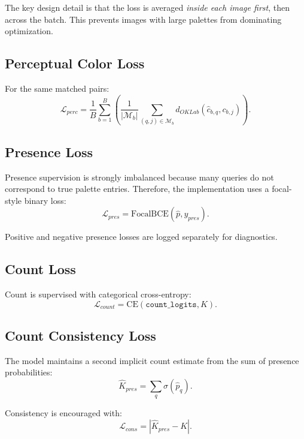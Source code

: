 \documentclass[11pt,a4paper]{article}
\begin{document}
The key design detail is that the loss is averaged \emph{inside each image first}, then across the batch. This prevents images with large palettes from dominating optimization.

\subsection{Perceptual Color Loss}

For the same matched pairs:
\begin{equation}
\mathcal{L}_{perc}
=
\frac{1}{B}
\sum_{b=1}^{B}
\left(
\frac{1}{|\mathcal{M}_b|}
\sum_{(q,j)\in\mathcal{M}_b}
d_{OKLab}(\hat{c}_{b,q}, c_{b,j})
\right).
\end{equation}

\subsection{Presence Loss}

Presence supervision is strongly imbalanced because many queries do not correspond to true palette entries. Therefore, the implementation uses a focal-style binary loss:
\begin{equation}
\mathcal{L}_{pres} = \text{FocalBCE}(\hat{p}, y_{pres}).
\end{equation}

Positive and negative presence losses are logged separately for diagnostics.

\subsection{Count Loss}

Count is supervised with categorical cross-entropy:
\begin{equation}
\mathcal{L}_{count}
=
\text{CE}(\texttt{count\_logits}, K).
\end{equation}

\subsection{Count Consistency Loss}

The model maintains a second implicit count estimate from the sum of presence probabilities:
\begin{equation}
\hat{K}_{pres} = \sum_q \sigma(\hat{p}_q).
\end{equation}

Consistency is encouraged with:
\begin{equation}
\mathcal{L}_{cons}
=
\left| \hat{K}_{pres} - K \right|.
\end{equation}
\end{document}
